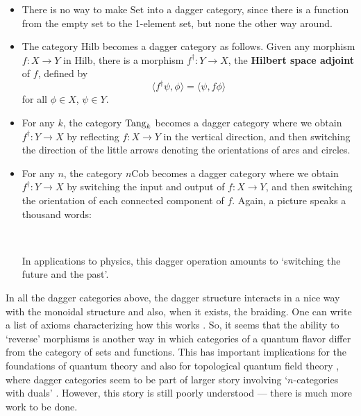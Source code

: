 \documentclass[12pt,twoside,openright]{report}
\newcommand{\Cob}{\mathrm{Cob}}
\newcommand{\Hilb}{\mathrm{Hilb}}
\newcommand{\Set}{\mathrm{Set}}
\newcommand{\Tang}{{\rm Tang}}
\newcommand{\maps}{\colon}
\newcommand{\multc}{
  \begin{scope}[left color=gray, right color=white]
    \shadedraw (1.5,2.5) 
      .. controls (1.5,1.1) and (.4,1.6) .. (.5,0) 
      .. controls (.4,-.25) and (-.4,-.25) .. (-.5,0)
      .. controls (-.4,1.6) and (-1.5,1.1) .. (-1.5,2.5)
      -- (-.5,2.5)
      .. controls (-.6,1.5)and (0.6,1.5) .. (.5,2.5)
      -- (1.5,2.5);
    \shadedraw (-1,2.5) ellipse (.5 and .2);
    \shadedraw (1,2.5) ellipse (.5 and .2);
  \end{scope}
  \draw[dashed] (0.5,0) arc (0:180:.5 and .2);
}
\newcommand{\comultc}{
  \begin{scope}[left color=gray, right color=white]
    \shadedraw (1.5,0) 
      .. controls (1.5,1.4) and (.4,.9) .. (.5,2.5)
      -- (-0.5,2.5)
      .. controls (-.4,.9) and (-1.5,1.4) .. (-1.5,0)
      .. controls (-1.4,-.25) and (-.6,-.25) .. (-.5,0)
      .. controls (-.6,1) and (0.6,1) .. (.5,0)
      .. controls (.6,-.25) and (1.4,-.25) .. (1.5,0);
    \shadedraw (0,2.5) ellipse (.5 and .2);
  \end{scope}
  \draw[dashed] (1.5,0) arc (0:180:.5 and .2);
  \draw[dashed] (-.5,0) arc (0:180:.5 and .2);
}
\begin{document}
\begin{itemize}
\item There is no way to make $\Set$ into a dagger category, since there is a function from the empty set to the 1-element set, but none the other way around.
\item The category $\Hilb$ becomes a dagger category as follows. Given any morphism $f \maps X \to Y$ in $\Hilb$, there is a morphism $f^\dagger \maps Y \to X$, the {\bf Hilbert space adjoint} 
of $f$, defined by 
\[         \langle f^\dagger \psi  , \phi \rangle = 
           \langle \psi, f \phi \rangle  \]
for all $\phi \in X$, $\psi \in Y$.  
\item For any $k$, the category $\Tang_k$ becomes a dagger category where we obtain $f^\dagger \maps Y \to X$ by reflecting
$f \maps X \to Y$ in the vertical direction, and then switching the direction of the little arrows denoting the orientations of arcs and circles.
\item For any $n$, the category $n\Cob$ becomes a dagger category where we obtain $f^\dagger \maps Y \to X$
by switching the input and output of $f \maps X \to Y$, and then switching the orientation of each connected component of $f$.  Again, a picture speaks a thousand words:
\begin{center}
  $\qquad ~ \qquad$
\end{center}
In applications to physics, this dagger operation amounts to
`switching the future and the past'.
\end{itemize}

In all the dagger categories above, the dagger structure interacts in a nice way with the monoidal structure and also, when it exists, the braiding.  One can write a list of axioms characterizing how this works \cite{Abramsky,AC,Selinger}.  So, it seems that the ability to `reverse' morphisms is another way in which categories of a quantum flavor differ from the category of sets and functions. This has important implications for the foundations of quantum theory 
\cite{B4} and also for topological quantum field theory \cite{HDATQFT}, where dagger categories seem to be part of larger story involving
`$n$-categories with duals' \cite{HDA4}.  However, this story is still poorly understood --- there is much more work to be done.
\end{document}
